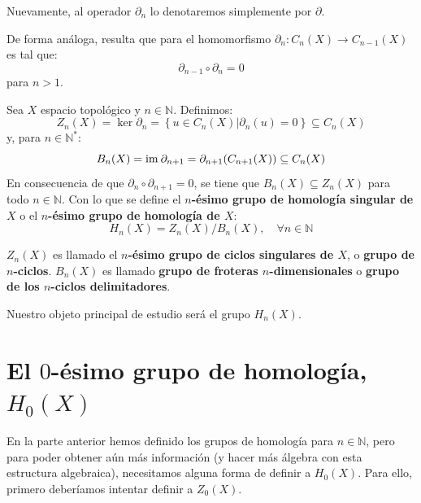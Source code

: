 \documentclass[12pt]{report}
\newcounter{it}
\theoremstyle{largebreak}
\newcommand\cf[3]{\ensuremath{#1:#2\rightarrow#3}}
\begin{document}
    \begin{obs}
        Nuevamente, al operador $\partial_n$ lo denotaremos simplemente por $\partial$.
    \end{obs}

    \begin{obs}
        De forma análoga, resulta que para el homomorfismo $\cf{\partial_n}{C_n(X)}{C_{n-1}(X)}$ es tal que:
        \begin{equation*}
            \partial_{n-1}\circ\partial_n=0
        \end{equation*}
        para $n>1$.
    \end{obs}

    \begin{mydef}
        Sea $X$ espacio topológico y $n\in\mathbb{N}$. Definimos:
        \begin{equation*}
            Z_n(X)=\ker\partial_n=\left\{u\in C_n(X)\Big|\partial_n(u)=0 \right\}\subseteq C_n(X)
        \end{equation*}
        y, para $n\in\mathbb{N}^*$:
        \begin{equation*}
            B_n(X)=\textup{im}\:\partial_{n+1}=\partial_{n+1}(C_{n+1}(X))\subseteq C_n(X)
        \end{equation*}
        En consecuencia de que $\partial_n\circ\partial_{n+1} = 0$, se tiene que $B_n(X)\subseteq Z_n(X)$ para todo $n\in\mathbb{N}$. Con lo que se define el \textbf{$n$-ésimo grupo de homología singular de $X$} o el \textbf{$n$-ésimo grupo de homología de $X$}:
        \begin{equation*}
            H_n(X)=Z_n(X)/B_n(X),\quad\forall n\in\mathbb{N}
        \end{equation*}

        $Z_n(X)$ es llamado el \textbf{$n$-ésimo grupo de ciclos singulares de $X$}, o \textbf{grupo de $n$-ciclos}. $B_n(X)$ es llamado \textbf{grupo de froteras $n$-dimensionales} o \textbf{grupo de los $n$-ciclos delimitadores}.
    \end{mydef}

    Nuestro objeto principal de estudio será el grupo $H_n(X)$.

    \section{El $0$-ésimo grupo de homología, $H_0(X)$}

    En la parte anterior hemos definido los grupos de homología para $n\in\mathbb{N}$, pero para poder obtener aún más información (y hacer más álgebra con esta estructura algebraica), necesitamos alguna forma de definir a $H_0(X)$. Para ello, primero deberíamos intentar definir a $Z_0(X)$.
\end{document}

